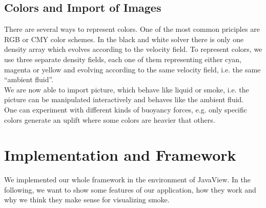 \documentclass[a4paper,10pt,oneside,final,german,openbib,pdftex,titlepage]{scrbook}
\begin{document}
\section{Colors and Import of Images}
There are several ways to represent colors. One of the most common priciples are RGB or CMY color schemes. In the black and white solver there is only one density array which evolves according to the velocity field. To represent colors, we use three separate density fields, each one of them representing either cyan, magenta or yellow and evolving according to the same velocity field, i.e. the same ``ambient fluid''.\\

We are now able to import picture, which behave like liquid or smoke, i.e. the picture can be manipulated interactively and behaves like the ambient fluid.\\
One can experiment with different kinds of buoyancy forces, e.g. only specific colors generate an uplift where some colors are heavier that others. 

\chapter{Implementation and Framework}
We implemented our whole framework in the environment of JavaView. In the following, we want to show some features of our application, how they work and why we think they make sense for visualizing smoke.
%
\end{document}
